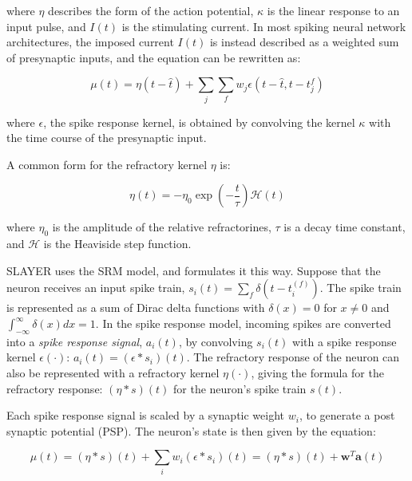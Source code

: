 \documentclass[fyp]{socreport}
\begin{document}
where $\eta$ describes the form of the action potential, $\kappa$ is the linear
response to an input pulse, and $I(t)$ is the stimulating current. In most
spiking neural network architectures, the imposed current $I(t)$ is instead
described as a weighted sum of presynaptic inputs, and the equation can be
rewritten as:

\begin{equation}
  \label{eq:srm-2}
  \mu(t) = \eta(t - \hat{t}) + \sum_{j} \sum_{f} w_{j}\epsilon(t - \hat{t}, t-t_{j}^{f})
\end{equation}


where $\epsilon$, the spike response kernel, is obtained by convolving the
kernel $\kappa$ with the time course of the presynaptic input.

A common form for the refractory kernel $\eta$ is:

\begin{equation}
  \label{eq:srm_eta}
  \eta(t) = - \eta_{0} \exp \left(- \frac{t}{\tau}\right) \mathcal{H}(t)
\end{equation}

where $\eta_{0}$ is the amplitude of the relative refractorines, $\tau$ is a
decay time constant, and $\mathcal{H}$ is the Heaviside step function.

SLAYER uses the SRM model, and formulates it this way. Suppose that the neuron
receives an input spike train,
$s_i(t) = \sum_{f} \delta\left( t - t_i^{(f)} \right)$. The spike train is
represented as a sum of Dirac delta functions with \(\delta(x) = 0\) for
\(x \ne 0\) and \(\int_{-\infty}^{\infty} \delta(x)dx = 1\). In the spike
response model, incoming spikes are converted into a \emph{spike response
  signal}, $a_{i}(t)$, by convolving $s_{i}(t)$ with a spike response kernel
$\epsilon(\cdot)$: $a_{i}(t) = (\epsilon \ast s_{i})(t)$. The refractory
response of the neuron can also be represented with a refractory kernel
$\eta(\cdot)$, giving the formula for the refractory response:
$(\eta \ast s)(t)$ for the neuron's spike train $s(t)$.

Each spike response signal is scaled by a synaptic weight $w_{i}$, to generate a
post synaptic potential (PSP). The neuron's state is then given by the equation:

\begin{equation}
  \label{eq:slayer_srm}
  \mu(t) = (\eta \ast s)(t) + \sum_{i} w_{i}(\epsilon \ast s_{i})(t) = (\eta \ast s)(t) + \boldsymbol{w}^{T} \boldsymbol{a}(t)
\end{equation}
\end{document}
